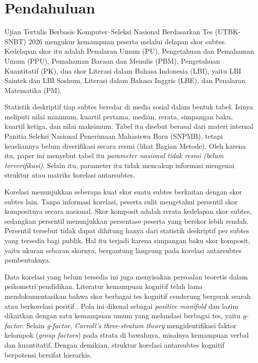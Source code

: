 \section{Pendahuluan}

Ujian Tertulis Berbasis Komputer--Seleksi Nasional Berdasarkan Tes (UTBK-SNBT) 2026 mengukur kemampuan peserta melalui delapan skor subtes. Kedelapan skor itu adalah Penalaran Umum (PU), Pengetahuan dan Pemahaman Umum (PPU), Pemahaman Bacaan dan Menulis (PBM), Pengetahuan Kuantitatif (PK), dua skor Literasi dalam Bahasa Indonesia (LBI), yaitu LBI Saintek dan LBI Soshum, Literasi dalam Bahasa Inggris (LBE), dan Penalaran Matematika (PM).

Statistik deskriptif tiap subtes beredar di media sosial dalam bentuk tabel. Isinya meliputi nilai minimum, kuartil pertama, median, rerata, simpangan baku, kuartil ketiga, dan nilai maksimum. Tabel itu disebut berasal dari materi internal Panitia Seleksi Nasional Penerimaan Mahasiswa Baru (SNPMB), tetapi keasliannya belum diverifikasi secara resmi (lihat Bagian Metode). Oleh karena itu, paper ini menyebut tabel itu \textit{parameter nasional tidak resmi (belum terverifikasi)}. Selain itu, parameter itu tidak mencakup informasi mengenai struktur atau matriks korelasi antarsubtes.

Korelasi menunjukkan seberapa kuat skor suatu subtes berkaitan dengan skor subtes lain. Tanpa informasi korelasi, peserta sulit mengetahui persentil skor kompositnya secara nasional. Skor komposit adalah rerata kedelapan skor subtes, sedangkan persentil menunjukkan persentase peserta yang berskor lebih rendah. Persentil tersebut tidak dapat dihitung hanya dari statistik deskriptif per subtes yang tersedia bagi publik. Hal itu terjadi karena simpangan baku skor komposit, yaitu ukuran sebaran skornya, bergantung langsung pada korelasi antarsubtes pembentuknya.

Data korelasi yang belum tersedia ini juga menyisakan persoalan teoretis dalam psikometri pendidikan. Literatur kemampuan kognitif telah lama mendokumentasikan bahwa skor berbagai tes kognitif cenderung bergerak searah atau berkorelasi positif \autocite{spearman1904,carroll1993,jensen1998}. Pola ini dikenal sebagai \textit{positive manifold} dan lazim dikaitkan dengan satu kemampuan umum yang melandasi berbagai tes, yaitu \textit{g-factor}. Selain \textit{g-factor}, \textit{Carroll's three-stratum theory} \autocite{carroll1993} mengidentifikasi faktor kelompok (\textit{group factors}) pada strata di bawahnya, misalnya kemampuan verbal dan kuantitatif. Dengan demikian, struktur korelasi antarsubtes kognitif berpotensi bersifat hierarkis.

